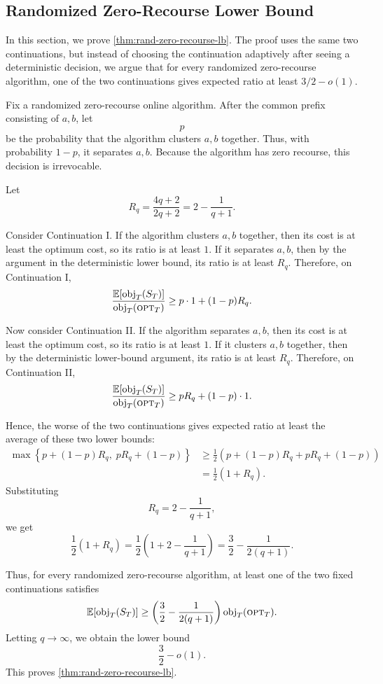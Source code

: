 \subsection{Randomized Zero-Recourse Lower Bound}

In this section, we prove \cref{thm:rand-zero-recourse-lb}. The proof uses the same two continuations, but instead of choosing the continuation adaptively after seeing a deterministic decision, we argue that for every randomized zero-recourse algorithm, one of the two continuations gives expected ratio at least \(3/2-o(1)\).

Fix a randomized zero-recourse online algorithm. After the common prefix consisting of \(a,b\), let
\[
    p
\]
be the probability that the algorithm clusters \(a,b\) together. Thus, with probability \(1-p\), it separates \(a,b\). Because the algorithm has zero recourse, this decision is irrevocable.

Let
\[
    R_q
    =
    \frac{4q+2}{2q+2}
    =
    2-\frac{1}{q+1}.
\]

Consider Continuation I. If the algorithm clusters \(a,b\) together, then its cost is at least the optimum cost, so its ratio is at least \(1\). If it separates \(a,b\), then by the argument in the deterministic lower bound, its ratio is at least \(R_q\). Therefore, on Continuation I,
\[
    \frac{\mathbb E[\text{obj}_T(S_T)]}{\text{obj}_T(\textsc{opt}_T)}
    \ge
    p\cdot 1+(1-p)R_q.
\]

Now consider Continuation II. If the algorithm separates \(a,b\), then its cost is at least the optimum cost, so its ratio is at least \(1\). If it clusters \(a,b\) together, then by the deterministic lower-bound argument, its ratio is at least \(R_q\). Therefore, on Continuation II,
\[
    \frac{\mathbb E[\text{obj}_T(S_T)]}{\text{obj}_T(\textsc{opt}_T)}
    \ge
    pR_q+(1-p)\cdot 1.
\]

Hence, the worse of the two continuations gives expected ratio at least the average of these two lower bounds:
\[
\begin{aligned}
    \max\left\{
        p+(1-p)R_q,\;
        pR_q+(1-p)
    \right\}
    &\ge
    \frac12
    \left(
        p+(1-p)R_q
        +
        pR_q+(1-p)
    \right)\\
    &=
    \frac12(1+R_q).
\end{aligned}
\]
Substituting
\[
    R_q=2-\frac{1}{q+1},
\]
we get
\[
    \frac12(1+R_q)
    =
    \frac12
    \left(
        1+2-\frac{1}{q+1}
    \right)
    =
    \frac32-\frac{1}{2(q+1)}.
\]

Thus, for every randomized zero-recourse algorithm, at least one of the two fixed continuations satisfies
\[
    \mathbb E[\text{obj}_T(S_T)]
    \ge
    \left(
        \frac32-\frac{1}{2(q+1)}
    \right)\text{obj}_T(\textsc{opt}_T).
\]
Letting \(q\to\infty\), we obtain the lower bound
\[
    \frac32-o(1).
\]
This proves \cref{thm:rand-zero-recourse-lb}.

